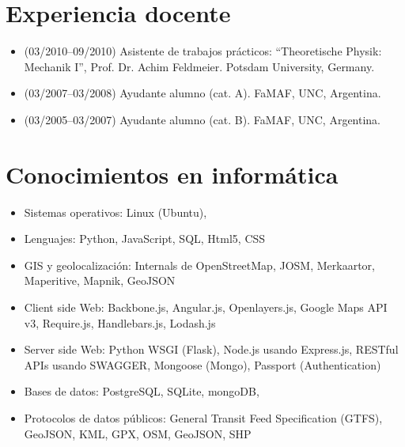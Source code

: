 \documentclass[a4paper]{article}
\begin{document}
\section{Experiencia docente}
\begin{itemize}
 \item(03/2010--09/2010) Asistente de trabajos prácticos: ``Theoretische
Physik: Mechanik I'', Prof. Dr. Achim Feldmeier. Potsdam University, Germany.
 \item(03/2007--03/2008) Ayudante alumno (cat. A). FaMAF, UNC, Argentina.
 \item(03/2005--03/2007) Ayudante alumno (cat. B). FaMAF, UNC, Argentina.
\end{itemize}

\section{Conocimientos en informática}
\begin{itemize}
 \item Sistemas operativos: Linux (Ubuntu),
 \item Lenguajes: Python, JavaScript, SQL, Html5, CSS
 \item GIS y geolocalización: Internals de OpenStreetMap, JOSM, Merkaartor,
Maperitive, Mapnik, GeoJSON
 \item Client side Web: Backbone.js, Angular.js, Openlayers.js, Google Maps API 
v3, Require.js, Handlebars.js, Lodash.js
 \item Server side Web: Python WSGI (Flask), Node.js usando Express.js, 
RESTful APIs usando SWAGGER, Mongoose (Mongo), Passport (Authentication)
 \item Bases de datos: PostgreSQL, SQLite, mongoDB,
 \item Protocolos de datos públicos: General Transit Feed Specification (GTFS), 
GeoJSON, KML, GPX, OSM, GeoJSON, SHP
\end{itemize}
\end{document}
